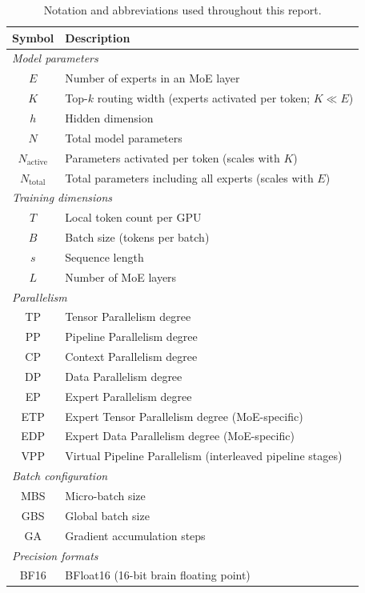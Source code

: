 \begin{table}[ht]
\centering
\caption{Notation and abbreviations used throughout this report.}
\label{tab:notation}
\begin{tabular}{cl}
\toprule
\textbf{Symbol} & \textbf{Description} \\
\midrule
\multicolumn{2}{l}{\emph{Model parameters}} \\
$E$ & Number of experts in an MoE layer \\
$K$ & Top-$k$ routing width (experts activated per token; $K \ll E$) \\
$h$ & Hidden dimension \\
$N$ & Total model parameters \\
$N_{\text{active}}$ & Parameters activated per token (scales with $K$) \\
$N_{\text{total}}$ & Total parameters including all experts (scales with $E$) \\
\midrule
\multicolumn{2}{l}{\emph{Training dimensions}} \\
$T$ & Local token count per GPU \\
$B$ & Batch size (tokens per batch) \\
$s$ & Sequence length \\
$L$ & Number of MoE layers \\
\midrule
\multicolumn{2}{l}{\emph{Parallelism}} \\
TP & Tensor Parallelism degree \\
PP & Pipeline Parallelism degree \\
CP & Context Parallelism degree \\
DP & Data Parallelism degree \\
EP & Expert Parallelism degree \\
ETP & Expert Tensor Parallelism degree (MoE-specific) \\
EDP & Expert Data Parallelism degree (MoE-specific) \\
VPP & Virtual Pipeline Parallelism (interleaved pipeline stages) \\
\midrule
\multicolumn{2}{l}{\emph{Batch configuration}} \\
MBS & Micro-batch size \\
GBS & Global batch size \\
GA & Gradient accumulation steps \\
\midrule
\multicolumn{2}{l}{\emph{Precision formats}} \\
BF16 & BFloat16 (16-bit brain floating point) \\

\end{tabular}
\end{table}
